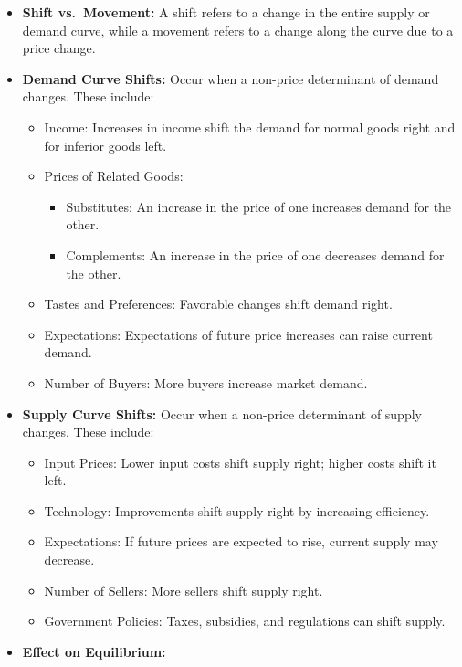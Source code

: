 \documentclass[
]{book}
\providecommand{\tightlist}{%
  \setlength{\itemsep}{0pt}\setlength{\parskip}{0pt}}
\begin{document}
\begin{enumerate}
  \begin{itemize}
  \tightlist
  \item
    \textbf{Shift vs.~Movement:} A shift refers to a change in the entire supply or demand curve, while a movement refers to a change along the curve due to a price change.
  \item
    \textbf{Demand Curve Shifts:} Occur when a non-price determinant of demand changes. These include:

    \begin{itemize}
    \tightlist
    \item
      Income: Increases in income shift the demand for normal goods right and for inferior goods left.
    \item
      Prices of Related Goods:

      \begin{itemize}
      \tightlist
      \item
        Substitutes: An increase in the price of one increases demand for the other.
      \item
        Complements: An increase in the price of one decreases demand for the other.
      \end{itemize}
    \item
      Tastes and Preferences: Favorable changes shift demand right.
    \item
      Expectations: Expectations of future price increases can raise current demand.
    \item
      Number of Buyers: More buyers increase market demand.
    \end{itemize}
  \item
    \textbf{Supply Curve Shifts:} Occur when a non-price determinant of supply changes. These include:

    \begin{itemize}
    \tightlist
    \item
      Input Prices: Lower input costs shift supply right; higher costs shift it left.
    \item
      Technology: Improvements shift supply right by increasing efficiency.
    \item
      Expectations: If future prices are expected to rise, current supply may decrease.
    \item
      Number of Sellers: More sellers shift supply right.
    \item
      Government Policies: Taxes, subsidies, and regulations can shift supply.
    \end{itemize}
  \item
    \textbf{Effect on Equilibrium:}


\end{itemize}
\end{enumerate}
\end{document}
